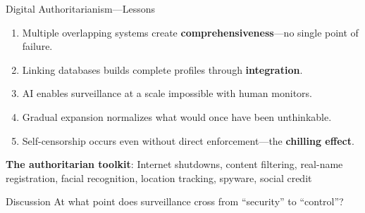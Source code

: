 ﻿\documentclass[aspectratio=169,11pt]{beamer}
\begin{document}
\begin{frame}{Digital Authoritarianism---Lessons}
\begin{conceptbox}
\small
\begin{enumerate}
    \item Multiple overlapping systems create \textbf{comprehensiveness}---no single point of failure.
    \item Linking databases builds complete profiles through \textbf{integration}.
    \item AI enables surveillance at a scale impossible with human monitors.
    \item Gradual expansion normalizes what would once have been unthinkable.
    \item Self-censorship occurs even without direct enforcement---the \textbf{chilling effect}.
\end{enumerate}
\end{conceptbox}

\vspace{0.3em}
\textbf{The authoritarian toolkit}: Internet shutdowns, content filtering, real-name registration, facial recognition, location tracking, spyware, social credit

\begin{alertblock}{Discussion}
At what point does surveillance cross from ``security'' to ``control''?
\end{alertblock}
\end{frame}
\end{document}
